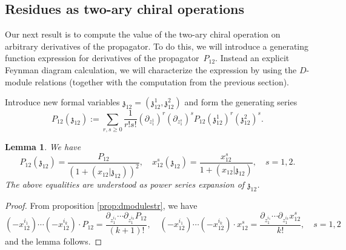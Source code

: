 \documentclass[11pt]{amsart}
\newtheorem{lem}[thm]{Lemma}
\theoremstyle{definition}
\theoremstyle{remark}
\numberwithin{equation}{section}
\begin{document}
\subsection{Residues as two-ary chiral operations}

Our next result is to compute the value of the two-ary chiral operation on arbitrary derivatives of the propagator.
To do this, we will introduce a generating function expression for derivatives of the propagator~$P_{12}$.
Instead an explicit Feynman diagram calculation, we will characterize the expression by using the $D$-module relations
(together with the computation from the previous section).

Introduce new formal variables $\mathfrak{z}_{12}=(\mathfrak{z}_{12}^1,\mathfrak{z}^2_{12})$ and form the generating series
$$
P_{12}(\mathfrak{z}_{12}):=\sum_{r,s\geq 0}\frac{1}{r!s!}(\partial_{z^1_1})^r(\partial_{z^s_1})^sP_{12}(\mathfrak{z}^1_{12})^r(\mathfrak{z}^2_{12})^s.
$$

\begin{lem}
  We have
  $$
  P_{12}(\mathfrak{z}_{12})=\frac{P_{12}}{\left(1+(x_{12}|\mathfrak{z}_{12})\right)^2},\quad x^s_{12}(\mathfrak{z}_{12})=\frac{x^s_{12}}{1+(x_{12}|\mathfrak{z}_{12})},\quad s=1,2.
  $$
  The above equalities are understood as power series expansion of $\mathfrak{z}_{12}$.
\end{lem}

\begin{proof}
  From proposition \ref{prop:dmodulestr}, we have
  $$
  (-x^{i_1}_{12})\cdots (-x^{i_k}_{12})\cdot P_{12}=\frac{\partial_{z^{i_1}_1}\cdots \partial_{z^{i_k}_1}P_{12}}{  (k+1)!},\quad   (-x^{i_1}_{12})\cdots (-x^{i_k}_{12})\cdot x^s_{12}=\frac{\partial_{z^{i_1}_1}\cdots \partial_{z^{i_k}_1}x^s_{12}}{  k!},\quad s=1,2
  $$
  and the lemma follows.
\end{proof}
\end{document}
